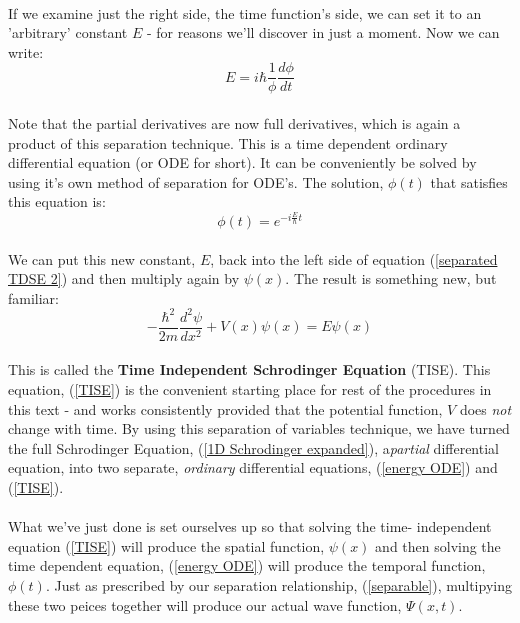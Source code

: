 \documentclass[12pt,letterpaper]{book}
\begin{document}
\paragraph*{}If we examine just the right side, the time function's side, we can set it to an 'arbitrary' constant $E$ - for reasons we'll discover in just a moment. Now we can write:
\begin{equation}
\label{energy ODE}
E = i\hbar \frac{1}{\phi}\frac{d\phi}{dt}
\end{equation}
\paragraph*{}Note that the partial derivatives are now full derivatives, which is again a product of this separation technique. This is a time dependent ordinary differential equation (or ODE for short). It can be conveniently be solved by using it's own method of separation for ODE's. The solution, $\phi(t)$ that satisfies this equation is:
\begin{equation}
\label{phi}
\phi(t) =  e^{-i\frac{E}{\hbar}t}
\end{equation}
\paragraph*{} We can put this new constant, $E$, back into the left side of equation (\ref{separated TDSE 2}) and then multiply again by $\psi(x)$. The result is something new, but familiar:
\begin{equation}
\label{TISE}
-\frac{\hbar^2}{2m}\frac{d^2\psi}{dx^2} + V(x)\psi(x) = E\psi(x)
\end{equation}
\paragraph*{}This is called the \textbf{Time Independent Schrodinger Equation} (TISE). This equation, (\ref{TISE}) is the convenient starting place for rest of the procedures in this text - and works consistently provided that the potential function, $V$ does \textit{not} change with time. By using this separation of variables technique, we have turned the full Schrodinger Equation, (\ref{1D Schrodinger expanded}), a\textit{partial} differential equation, into two separate, \textit{ordinary} differential equations, 
(\ref{energy ODE}) and  (\ref{TISE}). 
\paragraph*{}What we've just done is set ourselves up so that solving the time- independent equation (\ref{TISE}) will produce the spatial function, $\psi(x)$ and then solving the time dependent equation, (\ref{energy ODE}) will produce the temporal function, $\phi(t)$. Just as prescribed by our separation relationship, (\ref{separable}), multipying these two peices together will produce our actual wave function, $\Psi(x,t)$. 
\end{document}
